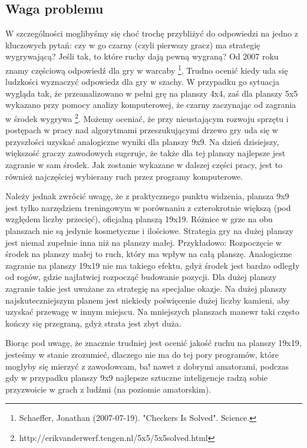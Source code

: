 \documentclass[11pt,leqno]{article}
\begin{document}
\subsection{Waga problemu}

W szczególności moglibyśmy się choć trochę przybliżyć do odpowiedzi na jedno z kluczowych pytań: czy w go czarny
 (czyli pierwszy gracz) ma strategię wygrywającą? Jeśli tak, to które ruchy dają pewną wygraną? Od 2007 roku znamy częściową
 odpowiedź dla gry w warcaby \footnote{Schaeffer, Jonathan (2007-07-19). "Checkers Is Solved". Science.}.
 Trudno ocenić kiedy uda się ludzkości wyznaczyć odpowiedz dla gry w szachy. W przypadku go 
sytuacja wygląda tak, że przeanalizowano w pełni grę na planszy 4x4, zaś dla planszy 5x5 wykazano przy pomocy analizy komputerowej,
 że czarny zaczynając od zagrania w środek wygrywa \footnote{http://erikvanderwerf.tengen.nl/5x5/5x5solved.html}. 
Możemy oceniać, że przy nieustającym rozwoju sprzętu i postępach w pracy nad
 algorytmami przeszukującymi drzewo gry uda się w przyszłości uzyskać analogiczne wyniki dla planszy 9x9. Na dzień dzisiejszy,
 większość graczy zawodowych sugeruje, że także dla tej planszy najlepsze jest zagranie w sam środek. Jak zostanie wykazane w 
dalszej części pracy, jest to również najczęściej wybierany ruch przez programy komputerowe.

Należy jednak zwrócić uwagę, że z praktycznego punktu widzenia, plansza 9x9 jest tylko narzędziem treningowym w 
porównaniu z czterokrotnie większą (pod względem liczby przecięć), oficjalną planszą 19x19. Różnice w grze na obu planszach
 nie są jedynie kosmetyczne i ilościowe. Strategia gry na dużej planszy jest niemal zupełnie inna niż na planszy małej. Przykładowo:
Rozpoczęcie w środek na planszy małej to ruch, który ma wpływ na całą planszę. Analogiczne zagranie na planszy 19x19 nie ma takiego 
efektu, gdyż środek jest bardzo odległy od rogów, gdzie najłatwiej rozpocząć budowanie pozycji. Dla dużej planszy zagranie takie jest
 uważane za strategię na specjalne okazje.
Na dużej planszy najskuteczniejszym planem jest niekiedy poświęcenie dużej liczby kamieni, aby uzyskać przewagę w innym miejscu.
 Na mniejszych planszach manewr taki często kończy się przegraną, gdyż strata jest zbyt duża.

Biorąc pod uwagę, że znacznie trudniej jest ocenić jakość ruchu na planszy 19x19, jesteśmy w stanie zrozumieć, dlaczego 
nie ma do tej pory programów, które mogłyby się mierzyć z zawodowcam, ba! nawet z dobrymi amatorami, podczas gdy w przypadku 
planszy 9x9 najlepsze sztuczne inteligencje radzą sobie przyzwoicie w grach z ludźmi (na poziomie amatorskim).
\end{document}
